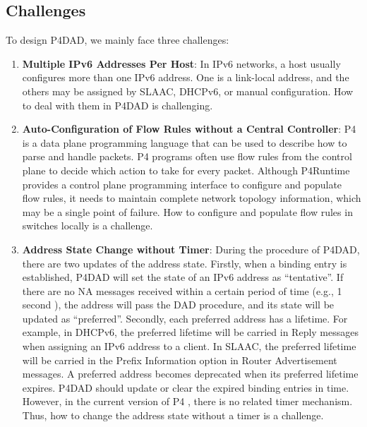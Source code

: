\documentclass[journal]{IEEEtran}
\begin{document}
    \subsection{Challenges}
        To design P4DAD, we mainly face three challenges:
        \begin{enumerate}
            \item \textbf{Multiple IPv6 Addresses Per Host}: In IPv6 networks, a host usually configures more than one IPv6 address. One is a link-local address, and the others may be assigned by SLAAC, DHCPv6, or manual configuration. How to deal with them in P4DAD is challenging.
            
            \item \textbf{Auto-Configuration of Flow Rules without a Central Controller}: P4 is a data plane programming language that can be used to describe how to parse and handle packets. P4 programs often use flow rules from the control plane to decide which action to take for every packet. Although P4Runtime \cite{p4runtime} provides a control plane programming interface to configure and populate flow rules, it needs to maintain complete network topology information, which may be a single point of failure. How to configure and populate flow rules in switches locally is a challenge.

            \item \textbf{Address State Change without Timer}: During the procedure of P4DAD, there are two updates of the address state. Firstly, when a binding entry is established, P4DAD will set the state of an IPv6 address as ``tentative''. If there are no NA messages received within a certain period of time (e.g., 1 second \cite{slaac}), the address will pass the DAD procedure, and its state will be updated as ``preferred''. 
            Secondly, each preferred address has a lifetime. For example, in DHCPv6, the preferred lifetime will be carried in Reply messages \cite{DHCPv6} when assigning an IPv6 address to a client. In SLAAC, the preferred lifetime will be carried in the Prefix Information option in Router Advertisement messages. A preferred address becomes deprecated when its preferred lifetime expires. 
            P4DAD should update or clear the expired binding entries in time. However, in the current version of P4 \cite{P4}, there is no related timer mechanism. Thus, how to change the address state without a timer is a challenge.

        \end{enumerate}
\end{document}
